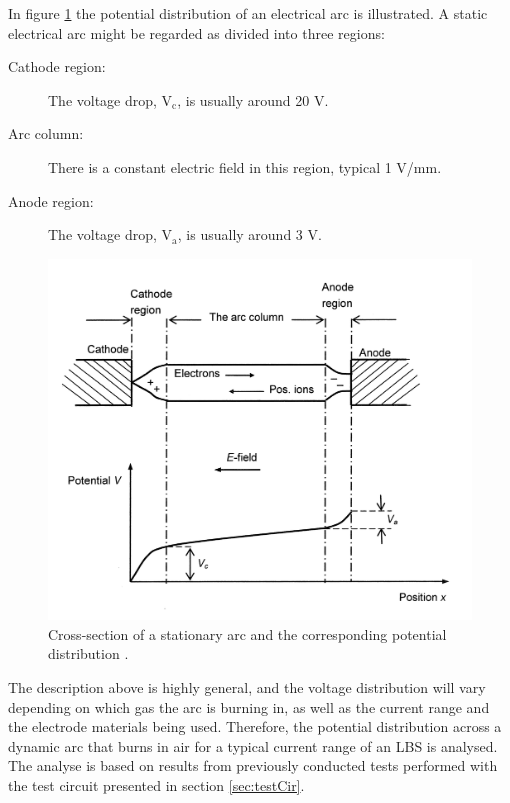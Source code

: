 \documentclass[10pt,b5paper,twoside]{article}
\begin{document}
In figure \ref{fig:potDisArc} the potential distribution of an electrical arc is illustrated. A static electrical arc might be regarded as divided into three regions:

\begin{description}
\item[Cathode region:] The voltage drop, $\mathrm{V_c}$, is usually around 20 V.
\item[Arc column:]	There is a constant electric field in this region, typical 1 V/mm.
\item[Anode region:] The voltage drop, $\mathrm{V_a}$, is usually around 3 V.
\end{description}

\begin{figure}[H]
\centering
\includegraphics[scale=0.8]{Bilder/Theory/potentialDistArc.png}
\caption{Cross-section of a stationary arc and the corresponding potential distribution \cite{bib:HVEbreak}.} \label{fig:potDisArc}
\end{figure}

The description above is highly general, and the voltage distribution will vary depending on which gas the arc is burning in, as well as the current range and the electrode materials being used. Therefore, the potential distribution across a dynamic arc that burns in air for a typical current range of an LBS is analysed. The analyse is based on results from previously conducted tests performed with the test circuit presented in section \ref{sec:testCir}.
\end{document}
